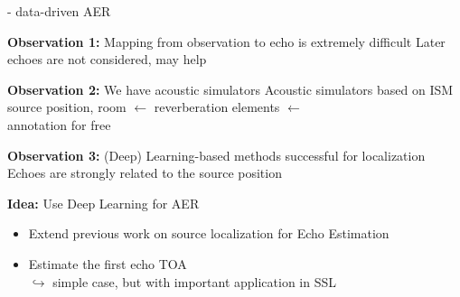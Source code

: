\begin{frame}{\lantern - data-driven AER}

    \begin{block}{\textbf{Observation 1:} Mapping from observation to echo is extremely difficult}
        Later echoes are not considered, may help
    \end{block}

    \begin{block}{\textbf{Observation 2:} We have acoustic simulators}
        Acoustic simulators based on ISM
        \\source position, room $\leftarrow$ reverberation elements $\leftarrow$
        \\annotation for free
    \end{block}

    \begin{block}{\textbf{Observation 3:} (Deep) Learning-based methods successful for localization}
        Echoes are strongly related to the source position
    \end{block}

    \begin{alertblock}{\textbf{Idea:} Use Deep Learning for AER}
        \begin{itemize}
            \item Extend previous work on source localization for Echo Estimation
            \item Estimate the first echo TOA
            \\$\hookrightarrow$ simple case, but with important application in SSL
        \end{itemize}
    \end{alertblock}

\end{frame}

